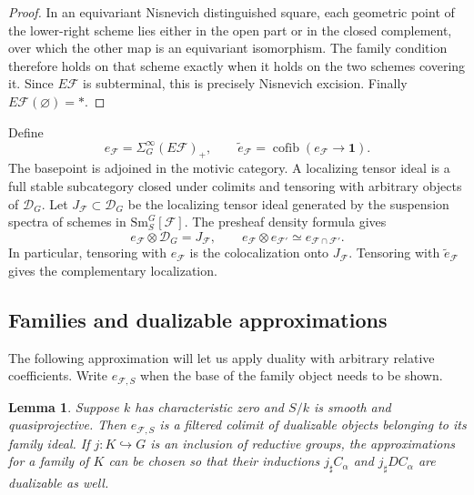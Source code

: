 \documentclass[11pt,reqno]{amsart}
\newtheorem{lemma}[theorem]{Lemma}
\theoremstyle{definition}
\theoremstyle{remark}
\theoremstyle{plain}
\numberwithin{equation}{section}
\newcommand{\one}{\mathbf 1}
\newcommand{\Sm}{\mathrm{Sm}}
\DeclareMathOperator{\cofib}{cofib}
\newcommand{\D}{\mathcal D}
\newcommand{\F}{\mathcal F}
\begin{document}
\begin{proof}
In an equivariant Nisnevich distinguished square, each geometric
point of the lower-right scheme lies either in the open part or
in the closed complement, over which the other map is an equivariant
isomorphism.
The family condition therefore holds on that scheme exactly when
it holds on the two schemes covering it.
Since \(E\F\) is subterminal, this is precisely Nisnevich excision.
Finally \(E\F(\varnothing)=*\).
\end{proof}

Define
\[
 e_\F=\Sigma^\infty_G(E\F)_+,
 \qquad
 \widetilde e_\F=\cofib(e_\F\to\one).
\]
The basepoint is adjoined in the motivic category.
A localizing tensor ideal is a full stable subcategory closed under
colimits and tensoring with arbitrary objects of \(\D_G\).
Let \(J_\F\subset\D_G\) be the localizing tensor ideal generated by
the suspension spectra of schemes in \(\Sm^G_S[\F]\).
The presheaf density formula gives
\[
 e_\F\otimes\D_G=J_\F,
 \qquad
 e_\F\otimes e_{\F'}\simeq e_{\F\cap\F'}.
\]
In particular, tensoring with \(e_\F\) is the colocalization onto
\(J_\F\).
Tensoring with \(\widetilde e_\F\) gives the complementary
localization.

\subsection{Families and dualizable approximations}

The following approximation will let us apply duality with arbitrary
relative coefficients. 
Write \(e_{\F,S}\) when the base of the family object needs to be shown.

\begin{lemma}\label{lem:new-family-approx}
Suppose \(k\) has characteristic zero and \(S/k\) is smooth and
quasiprojective. Then \(e_{\F,S}\) is a filtered colimit of dualizable
objects belonging to its family ideal.
If \(j:K\hookrightarrow G\) is an inclusion of reductive groups, the
approximations for a family of \(K\) can be chosen so that their
inductions \(j_\sharp C_\alpha\) and \(j_\sharp DC_\alpha\) are
dualizable as well.
\end{lemma}
\end{document}
